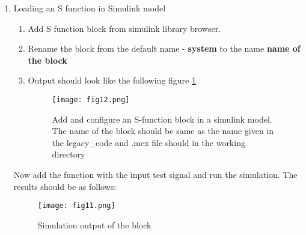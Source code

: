 \documentclass{article}
\begin{document}
\begin{enumerate}
\item Loading an S function in Simulink model
\begin{enumerate}
    \item Add S function block from simulink library browser.
    \item Rename the block from the default name - \textbf{system} to the name \textbf{name of the block}
    \item Output should look like the following figure \ref{fig:fig20}
\begin{figure}[h]
\centering
\texttt{[image: fig12.png]}
\caption{Add and configure an S-function block in a simulink model. The name of the block should be same as the name given in the legacy_code and .mex file should in the working directory}
\end{figure}
\end{enumerate}
Now add the function with the input test signal and run the simulation.
The results should be as follows:
\begin{figure}[H]
\centering
\texttt{[image: fig11.png]}
\caption{Simulation output of the block}
\label{fig:fig20}
\end{figure}
\end{enumerate}
\end{document}

